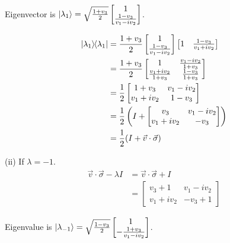 Eigenvector is $\ket{\lambda_1} = \sqrt{ \frac{1+v_3}{2 }} \begin{bmatrix}
1 \\
\frac{1-v_3}{v_1 - iv_2}
\end{bmatrix} $.

\begin{align*}
	\kb{\lambda_1} &= \frac{1+v_3}{2 } \begin{bmatrix}
		1 \\
		\frac{1-v_3}{v_1 - iv_2}
	\end{bmatrix}
	\begin{bmatrix}
   		1 &
   		\frac{1-v_3}{v_1 + iv_2}
	\end{bmatrix}\\
%
	&=
	 \frac{1+v_3}{2 } \begin{bmatrix}
    	 1 & \frac{v_1 - iv_2}{1 + v_3} \\
    	 \frac{v_1 + iv_2}{1 + v_3} & \frac{1-v_3}{1+v_3}
	 \end{bmatrix} \\
	 &=
	 \frac{1}{2} \begin{bmatrix}
    	 1+v_3 & v_1 - iv_2 \\
    	 v_1 + iv_2 & 1 - v_3
	 \end{bmatrix} \\
	 &=
	  \frac{1}{2} \left( I + \begin{bmatrix}
    	 v_3 & v_1 - iv_2 \\
    	 v_1 + iv_2 & - v_3
	 \end{bmatrix} \right) \\
	 &=
	 \frac{1}{2} (I + \vec{v} \cdot \vec{\sigma} )
\end{align*}



(ii) If $\lambda = -1$.
\begin{align*}
	\vec{v} \cdot \vec{\sigma}  - \lambda I &= \vec{v} \cdot \vec{\sigma}  + I\\
	&= \begin{bmatrix}
		v_3 + 1 & v_1 - i v_2 \\
		v_1 + i v_2 & - v_3 + 1
	\end{bmatrix}
\end{align*}

Eigenvalue is $\ket{\lambda_{-1}} = \sqrt{ \frac{1-v_3}{2 }} \begin{bmatrix}
    1 \\
    - \frac{1+v_3}{v_1 - iv_2}
\end{bmatrix} $.


